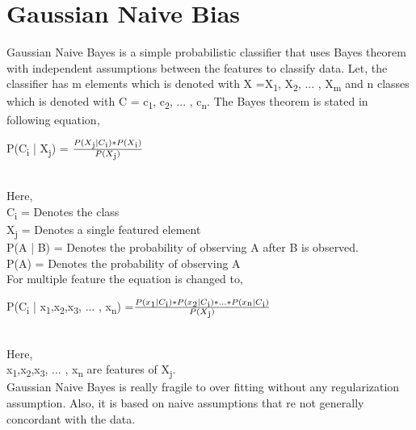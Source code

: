 \documentclass{standalone}
\begin{document}
\section{Gaussian Naive Bias}
Gaussian Naive Bayes is a simple probabilistic classifier that uses Bayes theorem with independent assumptions between the features to classify data. 
Let, the classifier has m elements which is denoted with X ={X\textsubscript{1}, X\textsubscript{2}, ... , X\textsubscript{m}} and n classes which is denoted with C = {c\textsubscript{1}, c\textsubscript{2}, ... , c\textsubscript{n}}.
The Bayes theorem is stated in following equation,\\

\begin{center}
	\makebox  P(C\textsubscript{i} | X\textsubscript{j}) = $ \frac{P(X\textsubscript{j} | C\textsubscript{i}) * P (X\textsubscript{i})}{P(X\textsubscript{j})} $ \\
\end{center}
\\
Here, \\
C\textsubscript{i} = Denotes the class\\
X\textsubscript{j} = Denotes a single featured element\\
P(A | B) = Denotes the probability of observing A after B is observed.\\
P(A) = Denotes the probability of  observing A\\ 
For multiple feature the equation is changed to,\\

\begin{center}
	\makebox  P(C\textsubscript{i} | x\textsubscript{1},x\textsubscript{2},x\textsubscript{3}, ... , x\textsubscript{n}) =$ \frac{P(x\textsubscript{1} | C\textsubscript{i}) * P(x\textsubscript{2} | C\textsubscript{i}) * ... * P(x\textsubscript{n} | C\textsubscript{i})}{P(X\textsubscript{j})} $ \\
\end{center}
\\
Here, \\
x\textsubscript{1},x\textsubscript{2},x\textsubscript{3}, ... , x\textsubscript{n} are features of X\textsubscript{j}.\\
Gaussian Naive Bayes is really fragile to over fitting without any regularization assumption. Also, it is based on naive assumptions that re not generally concordant with the data.
\end{document}
